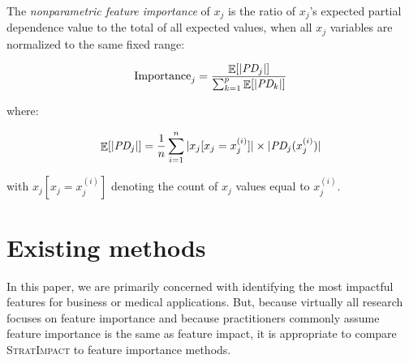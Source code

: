\documentclass[11pt]{article}
\newcommand{\eqnref}[1]{Equation~\ref{#1}}
\newcommand{\cut}[1]{}
\DeclareMathOperator{\Ex}{\mathbb{E}}
\newcommand{\simp}{\fontfamily{cmr}\textsc{\small StratImpact}}
\begin{document}
\cut{
While feature importances should not be interpreted as feature impacts, impacts can be effective as feature importances for model feature selection.  Features with the most impact on the response variable the most should coincide with the most predictive features. But, m

The definition of impact in \eqnref{eq:Epd2a} assumes that each $x_j$ value is equally likely, which is not the case in practice for $(\bf X, y)$ data sets. To go from partial dependence to importance, the $\text{\it PD}_j$ curve at $x_j=z$ must be weighted by the number of samples at $x_j=z$ before computing the average magnitude.  The red dots represent the $\text{\it PD}_j$ weighted according to the histogram height and the orange region represents the impact {\tt\small YearMade} has on the response variable, {\tt\small SalePrice}. While the {\tt\small YearMade} partial dependence curve is plausible before year 1990 (older bulldozers are worth less), there are so few data points that the collection of very old bulldozers should have little overall effect on the overall average sale price.  This leads to a definition based upon expected value rather than simple averages across $x_j$ domains.
}

~\\
 The {\em nonparametric feature importance} of $x_j$ is the ratio of $x_j$'s expected partial dependence value to the total of all expected values, when all $x_j$ variables are normalized to the same fixed range:

\begin{equation}\label{eq:Epd2b}
\text{Importance}_j = \frac{\Ex[|\text{\it PD}_j|]}{\sum_{k=1}^p \Ex[|\text{\it PD}_k|]}
\end{equation}

\noindent where:

\begin{equation}\label{eq:Epd2c}
\Ex[|\text{\it PD}_j|] = \frac{1}{n} \sum_{i=1}^{n} |x_j[x_j=x_j^{(i)}]| \times  |\text{\it PD}_j(x_j^{(i)})|
\end{equation}

\noindent with $x_j[x_j=x_j^{(i)}]$ denoting the count of $x_j$ values equal to $x_j^{(i)}$.

\section{Existing methods}\label{sec:existing}

In this paper, we are primarily concerned with identifying the most impactful features for business or medical applications. But, because virtually all research focuses on feature importance and because practitioners commonly assume feature importance is the same as feature impact, it is appropriate to compare \simp{} to  feature importance methods.
\end{document}
